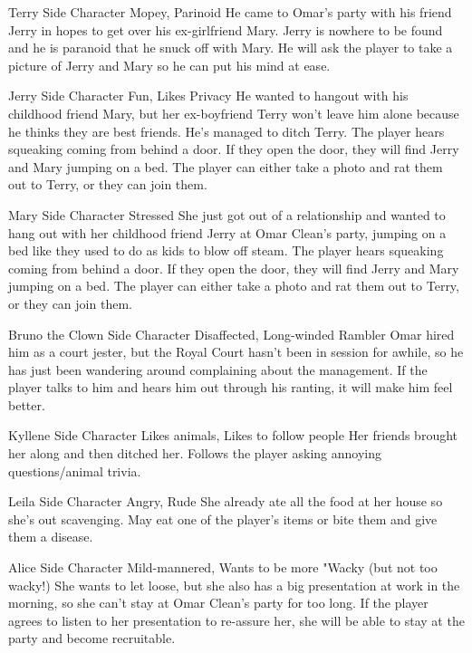 {Terry}
{Side Character}
{Mopey, Parinoid}
{He came to Omar's party with his friend Jerry in hopes to get over his ex-girlfriend Mary.}
{Jerry is nowhere to be found and he is paranoid that he snuck off with Mary. He will ask the player to take a picture of Jerry and Mary so he can put his mind at ease.}

{Jerry}
{Side Character}
{Fun, Likes Privacy}
{He wanted to hangout with his childhood friend Mary, but her ex-boyfriend Terry won't leave him alone because he thinks they are best friends. He's managed to ditch Terry.}
{The player hears squeaking coming from behind a door. If they open the door, they will find Jerry and Mary jumping on a bed. The player can either take a photo and rat them out to Terry, or they can join them.}

{Mary}
{Side Character}
{Stressed}
{She just got out of a relationship and wanted to hang out with her childhood friend Jerry at Omar Clean's party, jumping on a bed like they used to do as kids to blow off steam.}
{The player hears squeaking coming from behind a door. If they open the door, they will find Jerry and Mary jumping on a bed. The player can either take a photo and rat them out to Terry, or they can join them.}

{Bruno the Clown}
{Side Character}
{Disaffected, Long-winded Rambler}
{Omar hired him as a court jester, but the Royal Court hasn't been in session for awhile, so he has just been wandering around complaining about the management.}
{If the player talks to him and hears him out through his ranting, it will make him feel better.}

{Kyllene}
{Side Character}
{Likes animals, Likes to follow people}
{Her friends brought her along and then ditched her.}
{Follows the player asking annoying questions/animal trivia.}

{Leila}
{Side Character}
{Angry, Rude}
{She already ate all the food at her house so she's out scavenging.}
{May eat one of the player's items or bite them and give them a disease.}

{Alice}
{Side Character}
{Mild-mannered, Wants to be more "Wacky (but not too wacky!)}
{She wants to let loose, but she also has a big presentation at work in the morning, so she can't stay at Omar Clean's party for too long.}
{If the player agrees to listen to her presentation to re-assure her, she will be able to stay at the party and become recruitable.}

